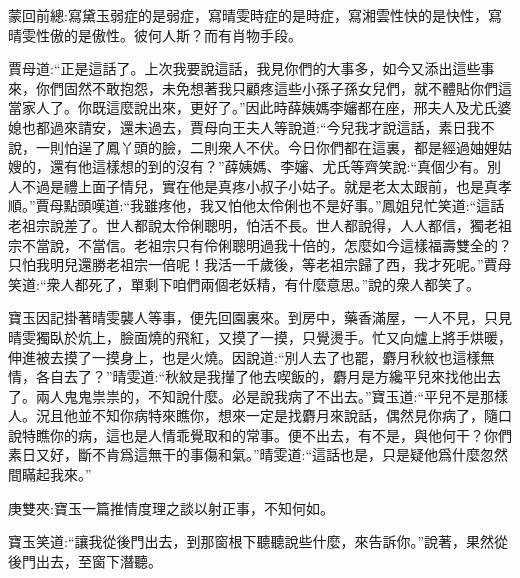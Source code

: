 

\begin{parag}
    \begin{note}蒙回前總:寫黛玉弱症的是弱症，寫晴雯時症的是時症，寫湘雲性快的是快性，寫晴雯性傲的是傲性。彼何人斯？而有肖物手段。\end{note}
\end{parag}


\begin{parag}
    賈母道:“正是這話了。上次我要說這話，我見你們的大事多，如今又添出這些事來，你們固然不敢抱怨，未免想著我只顧疼這些小孫子孫女兒們，就不體貼你們這當家人了。你既這麼說出來，更好了。”因此時薛姨媽李嬸都在座，邢夫人及尤氏婆媳也都過來請安，還未過去，賈母向王夫人等說道:“今兒我才說這話，素日我不說，一則怕逞了鳳丫頭的臉，二則衆人不伏。今日你們都在這裏，都是經過妯娌姑嫂的，還有他這樣想的到的沒有？”薛姨媽、李嬸、尤氏等齊笑說:“真個少有。別人不過是禮上面子情兒，實在他是真疼小叔子小姑子。就是老太太跟前，也是真孝順。”賈母點頭嘆道:“我雖疼他，我又怕他太伶俐也不是好事。”鳳姐兒忙笑道:“這話老祖宗說差了。世人都說太伶俐聰明，怕活不長。世人都說得，人人都信，獨老祖宗不當說，不當信。老祖宗只有伶俐聰明過我十倍的，怎麼如今這樣福壽雙全的？只怕我明兒還勝老祖宗一倍呢！我活一千歲後，等老祖宗歸了西，我才死呢。”賈母笑道:“衆人都死了，單剩下咱們兩個老妖精，有什麼意思。”說的衆人都笑了。
\end{parag}


\begin{parag}
    寶玉因記掛著晴雯襲人等事，便先回園裏來。到房中，藥香滿屋，一人不見，只見晴雯獨臥於炕上，臉面燒的飛紅，又摸了一摸，只覺燙手。忙又向爐上將手烘暖，伸進被去摸了一摸身上，也是火燒。因說道:“別人去了也罷，麝月秋紋也這樣無情，各自去了？”晴雯道:“秋紋是我攆了他去喫飯的，麝月是方纔平兒來找他出去了。兩人鬼鬼祟祟的，不知說什麼。必是說我病了不出去。”寶玉道:“平兒不是那樣人。況且他並不知你病特來瞧你，想來一定是找麝月來說話，偶然見你病了，隨口說特瞧你的病，這也是人情乖覺取和的常事。便不出去，有不是，與他何干？你們素日又好，斷不肯爲這無干的事傷和氣。”晴雯道:“這話也是，只是疑他爲什麼忽然間瞞起我來。”\begin{note}庚雙夾:寶玉一篇推情度理之談以射正事，不知何如。\end{note}寶玉笑道:“讓我從後門出去，到那窗根下聽聽說些什麼，來告訴你。”說著，果然從後門出去，至窗下潛聽。
\end{parag}


